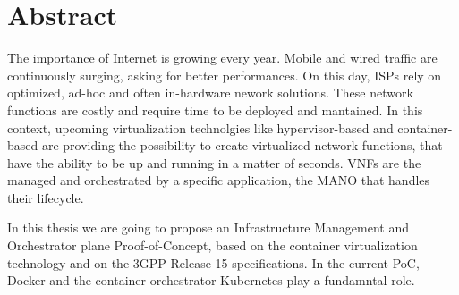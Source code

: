 \cleardoublepage
{}

\thispagestyle{empty}

\newenvironment{changemargin}[2]{%
\begin{list}{}{%
\setlength{\topsep}{0pt}%
\setlength{\leftmargin}{#1}%
\setlength{\rightmargin}{#2}%
\setlength{\listparindent}{\parindent}%
\setlength{\itemindent}{\parindent}%
\setlength{\parsep}{\parskip}%
}%
\item[]}{\end{list}}

\vspace*{\fill}
\begin{changemargin}{1.5cm}{1.5cm}
\section*{Abstract}
The importance of Internet is growing every year. Mobile and wired traffic are
continuously surging, asking for better performances. On this day, ISPs rely on
optimized, ad-hoc and often in-hardware nework solutions. These network
functions are costly and require time to be deployed and mantained. In this
context, upcoming virtualization technolgies like hypervisor-based and
container-based are providing the possibility to create virtualized network
functions, that have the ability to be up and running in a matter of seconds.
VNFs are the managed and orchestrated by a specific application, the MANO that
handles their lifecycle.

In this thesis we are going to propose an Infrastructure Management and
Orchestrator plane Proof-of-Concept, based on the container virtualization
technology and on the 3GPP Release 15 specifications. In the current PoC, Docker
and the container orchestrator Kubernetes play a fundamntal role.
\end{changemargin}
\vspace*{\fill}
